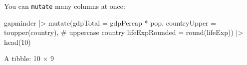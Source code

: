 \documentclass[
  letterpaper,
  DIV=11,
  numbers=noendperiod]{scrreprt}
\newenvironment{Shaded}{\begin{snugshade}}{\end{snugshade}}
\newcommand{\AttributeTok}[1]{\textcolor[rgb]{0.40,0.45,0.13}{#1}}
\newcommand{\CommentTok}[1]{\textcolor[rgb]{0.37,0.37,0.37}{#1}}
\newcommand{\DecValTok}[1]{\textcolor[rgb]{0.68,0.00,0.00}{#1}}
\newcommand{\FunctionTok}[1]{\textcolor[rgb]{0.28,0.35,0.67}{#1}}
\newcommand{\NormalTok}[1]{\textcolor[rgb]{0.00,0.23,0.31}{#1}}
\newcommand{\SpecialCharTok}[1]{\textcolor[rgb]{0.37,0.37,0.37}{#1}}
\begin{document}
You can \texttt{mutate} many columns at once:

\begin{Shaded}
\begin{Highlighting}[]
\NormalTok{gapminder }\SpecialCharTok{|\textgreater{}}
    \FunctionTok{mutate}\NormalTok{(}\AttributeTok{gdpTotal =}\NormalTok{ gdpPercap }\SpecialCharTok{*}\NormalTok{ pop,}
           \AttributeTok{countryUpper =} \FunctionTok{toupper}\NormalTok{(country), }\CommentTok{\# uppercase country}
           \AttributeTok{lifeExpRounded =} \FunctionTok{round}\NormalTok{(lifeExp)) }\SpecialCharTok{|\textgreater{}}
    \FunctionTok{head}\NormalTok{(}\DecValTok{10}\NormalTok{)}
\end{Highlighting}
\end{Shaded}

A tibble: 10 × 9
\end{document}
